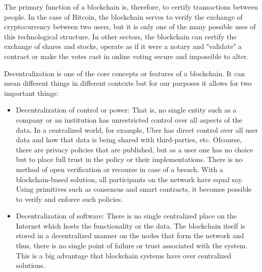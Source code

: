  The primary function of a blockchain is, therefore, to certify transactions between people. In the case of Bitcoin, the
 blockchain serves to verify the exchange of cryptocurrency between two users, but it is only one of the many possible
 uses of this technological structure. In other sectors, the blockchain can certify the exchange of shares and stocks,
 operate as if it were a notary and "validate" a contract or make the votes cast in online voting secure and impossible
 to alter.

Decentralization is one of the core concepts or features of a blockchain. It can mean different things in different
contexts but for our purposes it allows for two important things:
\begin{itemize}
    \item Decentralization of control or power: That is, no single entity such as a company or an institution has
        unrestricted control over all aspects of the data. In a centralized world, for example, Uber has direct control
        over all user data and how that data is being shared with third-parties, etc. Ofcourse, there are privacy
        policies that are published, but as a user one has no choice but to place full trust in the policy or their
        implementations. There is no method of open verification or recourse in case of a breach. With a
        blockchain-based solution, all participants on the network have equal say. Using primitives such as consensus
        and smart contracts, it becomes possible to verify and enforce such policies.
    \item Decentralization of software: There is no single centralized place on the Internet which hosts the
        functionality or the data. The blockchain itself is stored in a decentralized manner on the nodes that form the
        network and thus, there is no single point of failure or trust associated with the system. This is a big
        advantage that blockchain systems have over centralized solutions.
\end{itemize}

